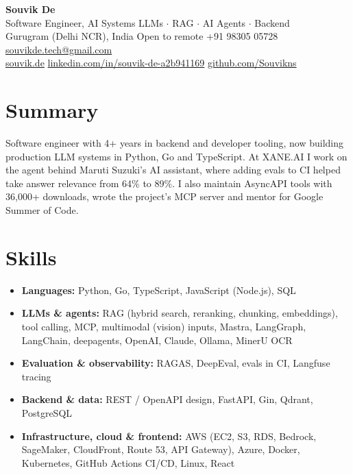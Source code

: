 \documentclass[10pt,a4paper]{article}
\begin{document}
\begin{center}
  {\LARGE\bfseries Souvik De}\\[3pt]
  {\large Software Engineer, AI Systems \textbar{} LLMs $\cdot$ RAG $\cdot$ AI Agents $\cdot$ Backend}\\[3pt]
  {\small Gurugram (Delhi NCR), India \textbar{} Open to remote
  \textbar{} +91 98305 05728
  \textbar{} \href{mailto:souvikde.tech@gmail.com}{souvikde.tech@gmail.com}\\
  \href{https://souvik.de/}{souvik.de}
  \textbar{} \href{https://www.linkedin.com/in/souvik-de-a2b941169/}{linkedin.com/in/souvik-de-a2b941169}
  \textbar{} \href{https://github.com/Souvikns/}{github.com/Souvikns}}
\end{center}

\section{Summary}
Software engineer with 4+ years in backend and developer tooling, now building production LLM systems in Python, Go and TypeScript. At XANE.AI I work on the agent behind Maruti Suzuki's AI assistant, where adding evals to CI helped take answer relevance from 64\% to 89\%. I also maintain AsyncAPI tools with 36,000+ downloads, wrote the project's MCP server and mentor for Google Summer of Code.

\section{Skills}
\begin{itemize}[label={},leftmargin=0pt,itemsep=1pt]
  \item \textbf{Languages:} Python, Go, TypeScript, JavaScript (Node.js), SQL
  \item \textbf{LLMs \& agents:} RAG (hybrid search, reranking, chunking, embeddings), tool calling, MCP, multimodal (vision) inputs, Mastra, LangGraph, LangChain, deepagents, OpenAI, Claude, Ollama, MinerU OCR
  \item \textbf{Evaluation \& observability:} RAGAS, DeepEval, evals in CI, Langfuse tracing
  \item \textbf{Backend \& data:} REST / OpenAPI design, FastAPI, Gin, Qdrant, PostgreSQL
  \item \textbf{Infrastructure, cloud \& frontend:} AWS (EC2, S3, RDS, Bedrock, SageMaker, CloudFront, Route 53, API Gateway), Azure, Docker, Kubernetes, GitHub Actions CI/CD, Linux, React
\end{itemize}
\end{document}
